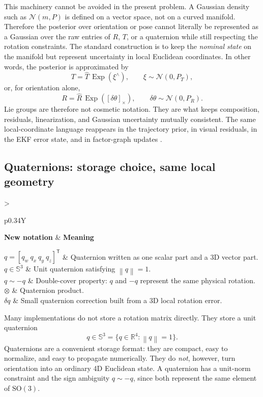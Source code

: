 \documentclass[11pt]{report}
\newcommand{\SO}{\mathrm{SO}(3)}
\newcommand{\Sthree}{\mathbb{S}^3}
\newcommand{\R}{\mathbb{R}}
\newcommand{\Exp}{\operatorname{Exp}}
\newcommand{\norm}[1]{\left\lVert #1 \right\rVert}
\newcommand{\tran}{^{\mathsf T}}
\newcommand{\NotationTable}[1]{%
\vspace{0.6mm}
{\scriptsize
\setlength{\tabcolsep}{2.5pt}
\begin{tabularx}{\columnwidth}{>{\raggedright\arraybackslash}p{0.34\columnwidth}Y}
\toprule
\textbf{New notation} & \textbf{Meaning}\\
\midrule
#1\\
\bottomrule
\end{tabularx}}
\vspace{0.8mm}}
\begin{document}
This machinery cannot be avoided in the present problem. A Gaussian density such as $\mathcal N(m,P)$ is defined on a vector space, not on a curved manifold. Therefore the posterior over orientation or pose cannot literally be represented as a Gaussian over the raw entries of $R$, $T$, or a quaternion while still respecting the rotation constraints. The standard construction is to keep the \emph{nominal state} on the manifold but represent uncertainty in local Euclidean coordinates. In other words, the posterior is approximated by
\begin{equation}
T = \widehat T\,\Exp(\xi^\wedge),
\qquad
\xi\sim\mathcal N(0,P_T),
\end{equation}
or, for orientation alone,
\begin{equation}
R = \widehat R\,\Exp([\delta\theta]_{\times}),
\qquad
\delta\theta\sim\mathcal N(0,P_R).
\end{equation}
Lie groups are therefore not cosmetic notation. They are what keeps composition, residuals, linearization, and Gaussian uncertainty mutually consistent. The same local-coordinate language reappears in the trajectory prior, in visual residuals, in the EKF error state, and in factor-graph updates \citep{sola2018micro,barrau2017invariant}.

\subsection{Quaternions: storage choice, same local geometry}
\NotationTable{
$q=[q_w\ q_x\ q_y\ q_z]\tran$ & Quaternion written as one scalar part and a 3D vector part.\\
$q\in\Sthree$ & Unit quaternion satisfying $\norm{q}=1$.\\
$q\sim -q$ & Double-cover property: $q$ and $-q$ represent the same physical rotation.\\
$\otimes$ & Quaternion product.\\
$\delta q$ & Small quaternion correction built from a 3D local rotation error.}

Many implementations do not store a rotation matrix directly. They store a unit quaternion
\begin{equation}
q\in\Sthree=\{q\in\R^4:\norm{q}=1\}.
\end{equation}
Quaternions are a convenient storage format: they are compact, easy to normalize, and easy to propagate numerically. They do \emph{not}, however, turn orientation into an ordinary 4D Euclidean state. A quaternion has a unit-norm constraint and the sign ambiguity $q\sim -q$, since both represent the same element of $\SO$.
\end{document}
